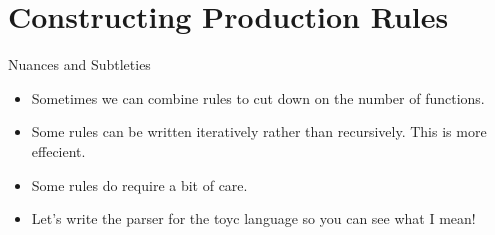 \documentclass[handout]{beamer}
\newenvironment{code}{%
 \VerbatimEnvironment
 \begin{adjustbox}{max width=\textwidth, max height=0.7\textheight}
 \begin{BVerbatim}
  }{
  \end{BVerbatim}
 \end{adjustbox}
}
\begin{document}
\section{Constructing Production Rules}

\begin{frame}{Nuances and Subtleties}
    \begin{itemize}
        \item Sometimes we can combine rules to cut down on the number of functions.
        \item Some rules can be written iteratively rather than recursively. This is more effecient.
        \item Some rules do require a bit of care.
        \item Let's write the parser for the toyc language so you can see what I mean!
    \end{itemize}
\end{frame}
\end{document}
